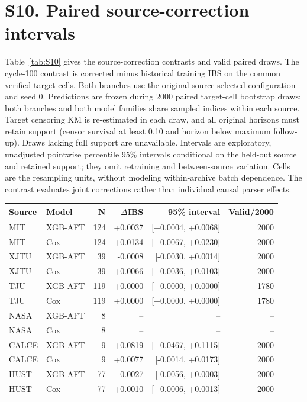 \documentclass[10pt,a4paper]{article}
\begin{document}
\section*{S10. Paired source-correction intervals}
Table~\ref{tab:S10} gives the source-correction contrasts and valid paired draws.
The cycle-100 contrast is corrected minus historical training IBS on the common verified target cells. Both branches use the original source-selected configuration and seed 0. Predictions are frozen during 2000 paired target-cell bootstrap draws; both branches and both model families share sampled indices within each source. Target censoring KM is re-estimated in each draw, and all original horizons must retain support (censor survival at least 0.10 and horizon below maximum follow-up). Draws lacking full support are unavailable. Intervals are exploratory, unadjusted pointwise percentile 95\% intervals conditional on the held-out source and retained support; they omit retraining and between-source variation. Cells are the resampling units, without modeling within-archive batch dependence. The contrast evaluates joint corrections rather than individual causal parser effects.
\begin{center}\small
\begin{minipage}{\linewidth}\centering
{}\label{tab:S10}
\begin{tabular}{llrrrr}\toprule
Source & Model & N & $\Delta$IBS & 95\% interval & Valid/2000\\\midrule
MIT & XGB-AFT & 124 & +0.0037 & [+0.0004, +0.0068] & 2000\\
MIT & Cox & 124 & +0.0134 & [+0.0067, +0.0230] & 2000\\
XJTU & XGB-AFT & 39 & -0.0008 & [-0.0030, +0.0014] & 2000\\
XJTU & Cox & 39 & +0.0066 & [+0.0036, +0.0103] & 2000\\
TJU & XGB-AFT & 119 & +0.0000 & [+0.0000, +0.0000] & 1780\\
TJU & Cox & 119 & +0.0000 & [+0.0000, +0.0000] & 1780\\
NASA & XGB-AFT & 8 & -- & -- & --\\
NASA & Cox & 8 & -- & -- & --\\
CALCE & XGB-AFT & 9 & +0.0819 & [+0.0467, +0.1115] & 2000\\
CALCE & Cox & 9 & +0.0077 & [-0.0014, +0.0173] & 2000\\
HUST & XGB-AFT & 77 & -0.0027 & [-0.0056, +0.0003] & 2000\\
HUST & Cox & 77 & +0.0010 & [+0.0006, +0.0013] & 2000\\
\bottomrule\end{tabular}\end{minipage}
\end{center}
\end{document}
